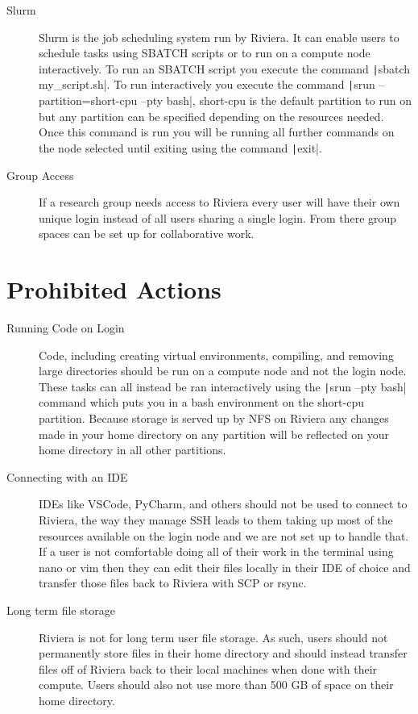 \documentclass[11pt,letterpaper]{article}
\begin{document}
\begin{description}
    \item[Slurm] Slurm is the job scheduling system run by Riviera. It can enable users to schedule tasks using SBATCH scripts or to run on a compute node interactively. To run an SBATCH script you execute the command \texttt|sbatch my_script.sh|. To run interactively you execute the command \texttt|srun --partition=short-cpu --pty bash|, short-cpu is the default partition to run on but any partition can be specified depending on the resources needed. Once this command is run you will be running all further commands on the node selected until exiting using the command \texttt|exit|. 
    \item[Group Access] If a research group needs access to Riviera every user will have their own unique login instead of all users sharing a single login. From there group spaces can be set up for collaborative work. 
\end{description}

\section{Prohibited Actions}
\begin{description}
    \item[Running Code on Login] Code, including creating virtual environments, compiling, and removing large directories should be run on a compute node and not the login node. These tasks can all instead be ran interactively using the \texttt|srun --pty bash| command which puts you in a bash environment on the short-cpu partition. Because storage is served up by NFS on Riviera any changes made in your home directory on any partition will be reflected on your home directory in all other partitions.
    \item[Connecting with an IDE] IDEs like VSCode, PyCharm, and others should not be used to connect to Riviera, the way they manage SSH leads to them taking up most of the resources available on the login node and we are not set up to handle that. If a user is not comfortable doing all of their work in the terminal using nano or vim then they can edit their files locally in their IDE of choice and transfer those files back to Riviera with SCP or rsync.
    \item[Long term file storage] Riviera is not for long term user file storage. As such, users should not permanently store files in their home directory and should instead transfer files off of Riviera back to their local machines when done with their compute. Users should also not use more than 500 GB of space on their home directory.  
\end{description}
\end{document}
